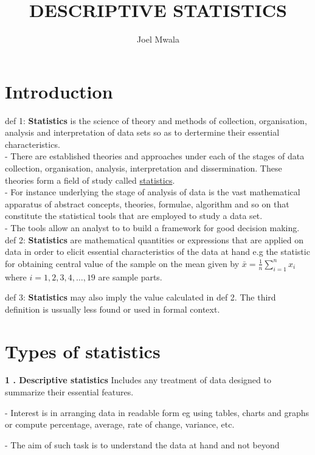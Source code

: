 \documentclass[12pt,a4paper]{article}
\title{DESCRIPTIVE STATISTICS}
\author{Joel Mwala}
\begin{document}
%
\maketitle

\section{Introduction}
\setlength{\parskip}{0.5em} %
def 1: \textbf{Statistics} is the science of theory and methods of collection, organisation, analysis and interpretation of data sets so as to dertermine their essential characteristics. \\ - There are established theories and approaches under each of the stages of data collection, organisation, analysis, interpretation and dissermination. These theories form a field of study called \underline{statistics}. \\ - For instance underlying the stage of analysis of data is the vast mathematical apparatus of abstract concepts, theories, formulae, algorithm and so on that constitute the statistical tools that are employed to study a data set. \\ - The tools allow an analyst to to build a framework for good decision making.
\newline
def 2: \textbf{Statistics} are mathematical quantities or expressions that are applied on data in order to elicit essential characteristics of the data at hand e.g the statistic for obtaining central value of the sample on the mean given by $\bar{x} = \frac{1}{n}\sum_{i = 1}^{n} x_i$ where $i = 1,2,3,4, \dots,19$ are sample parts. \

def 3: \textbf{Statistics} may also imply the value calculated in def 2.
The third definition is ussually less found or used in formal context.

\section{Types of statistics}
\textbf{1 . Descriptive statistics} Includes any treatment of data designed to summarize their essential features.

- Interest is in arranging data in readable form eg using tables, charts and graphs or compute percentage, average, rate of change, variance, etc.

- The aim of such task is to understand the data at hand and not beyond
\end{document}
